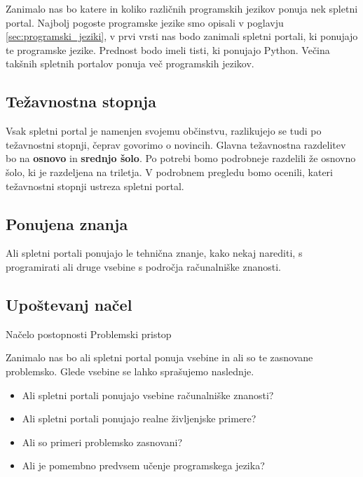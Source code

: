 Zanimalo nas bo katere in koliko različnih programskih jezikov ponuja
nek spletni portal. Najbolj pogoste programske jezike smo opisali v
poglavju \ref{sec:programski_jeziki}, v prvi vrsti nas bodo zanimali
spletni portali, ki ponujajo te programske jezike. Prednost bodo imeli
tisti, ki ponujajo Python. Večina takšnih spletnih portalov ponuja več
programskih jezikov.

\subsection{Težavnostna stopnja}
\label{sec:težavnostna_stopnja}

Vsak spletni portal je namenjen svojemu občinstvu, razlikujejo se tudi
po težavnostni stopnji, čeprav govorimo o novincih. Glavna težavnostna
razdelitev bo na \textbf{osnovo} in \textbf{srednjo šolo}. Po potrebi
bomo podrobneje razdelili že osnovno šolo, ki je razdeljena na
triletja. V podrobnem pregledu bomo ocenili, kateri težavnostni
stopnji ustreza spletni portal.


\subsection{Ponujena znanja}
\label{sec:vsebina_problemsk_pristop}

Ali spletni portali ponujajo le tehnična znanje, kako nekaj narediti, s
programirati ali druge vsebine s področja računalniške
znanosti.


\subsection{Upoštevanj načel}
\label{sec:upoštevanje_načel}

Načelo postopnosti
Problemski pristop

Zanimalo nas bo ali spletni portal ponuja vsebine in ali so te
zasnovane problemsko. Glede vsebine se lahko sprašujemo naslednje.

\begin{itemize}
\tightlist
\item Ali spletni portali ponujajo vsebine računalniške znanosti?
\item Ali spletni portali ponujajo realne življenjske primere?
\item Ali so primeri problemsko zasnovani?
\item Ali je pomembno predvsem učenje programskega jezika?
\end{itemize}

